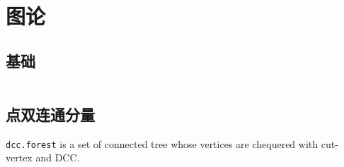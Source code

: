 \chapter{图论}
\section{基础}
\inputminted{cpp}{\source/graph-theory/basis.cpp}
\section{点双连通分量}
\texttt{dcc.forest} is a set of connected tree whose vertices are chequered with cut-vertex and DCC.
\inputminted{cpp}{\source/graph-theory/double-connected-graph-vertex.cpp}
